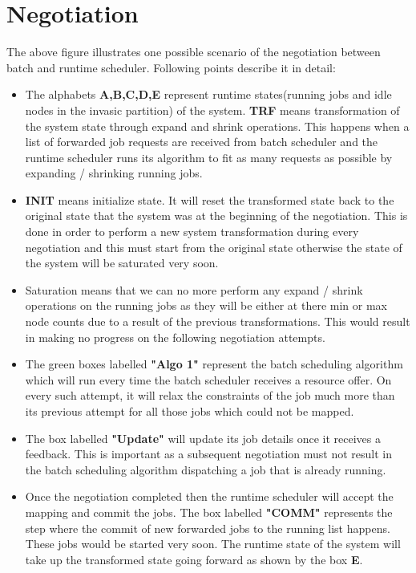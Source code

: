 \section{Negotiation}
The above figure illustrates one possible scenario of the negotiation between batch and runtime scheduler. Following points describe it in detail:
\begin{itemize}
\item The alphabets \textbf{A,B,C,D,E} represent runtime states(running jobs and idle nodes in the invasic partition) of the system. \textbf{TRF} means transformation of the system state through expand and shrink operations. This happens when a list of forwarded job requests are received from batch scheduler and the runtime scheduler runs its algorithm to fit as many requests as possible by expanding / shrinking running jobs.
\item \textbf{INIT} means initialize state. It will reset the transformed state back to the original state that the system was at the beginning of the negotiation. This is done in order to perform a new system transformation during every negotiation and this must start from the original state otherwise the state of the system will be saturated very soon.
\item Saturation means that we can no more perform any expand / shrink operations on the running jobs as they will be either at there min or max node counts due to a result of the previous transformations. This would result in making no progress on the following negotiation attempts.
\item The green boxes labelled \textbf{"Algo 1"} represent the batch scheduling algorithm which will run every time the batch scheduler receives a resource offer. On every such attempt, it will relax the constraints of the job much more than its previous attempt for all those jobs which could not be mapped.
\item The box labelled \textbf{"Update"} will update its job details once it receives a feedback. This is important as a subsequent negotiation must not result in the batch scheduling algorithm dispatching a job that is already running.
\item Once the negotiation completed then the runtime scheduler will accept the mapping and commit the jobs. The box labelled \textbf{"COMM"} represents the step where the commit of new forwarded jobs to the running list happens. These jobs would be started very soon. The runtime state of the system will take up the transformed state going forward as shown by the box \textbf{E}.
\end{itemize}
